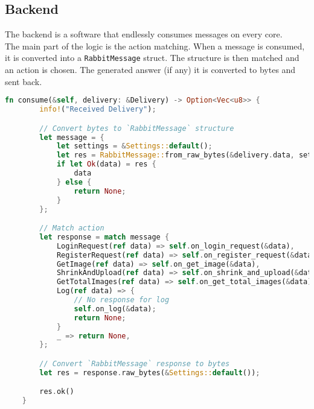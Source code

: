 \documentclass[../documentation.tex]{subfiles}
\begin{document}





\pagebreak

\subsection{Backend}

The backend is a software that endlessly
consumes messages on every core.
\\
The main part of the logic is the action matching.
When a message is consumed, it is converted into a 
\texttt{RabbitMessage} struct. The structure is then matched
and an action is chosen. The generated answer (if any)
it is converted to bytes and sent back.

\begin{lstlisting}[language=Rust, style=boxed, numbers=none]
    fn consume(&self, delivery: &Delivery) -> Option<Vec<u8>> {
        info!("Received Delivery");

        // Convert bytes to `RabbitMessage` structure
        let message = {
            let settings = &Settings::default();
            let res = RabbitMessage::from_raw_bytes(&delivery.data, settings);
            if let Ok(data) = res {
                data
            } else {
                return None;
            }
        };

        // Match action
        let response = match message {
            LoginRequest(ref data) => self.on_login_request(&data),
            RegisterRequest(ref data) => self.on_register_request(&data),
            GetImage(ref data) => self.on_get_image(&data),
            ShrinkAndUpload(ref data) => self.on_shrink_and_upload(&data),
            GetTotalImages(ref data) => self.on_get_total_images(&data),
            Log(ref data) => {
                // No response for log
                self.on_log(&data);
                return None;
            }
            _ => return None,
        };

        // Convert `RabbitMessage` response to bytes
        let res = response.raw_bytes(&Settings::default());

        res.ok()
    }
\end{lstlisting}
\end{document}
